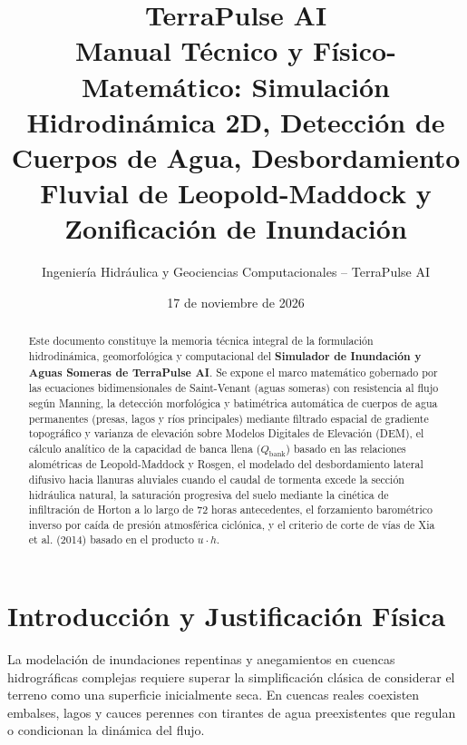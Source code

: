 \documentclass[11pt,a4paper]{article}
\title{\textbf{TerraPulse AI}\\[6pt]\Large Manual Técnico y Físico-Matemático: Simulación Hidrodinámica 2D, Detección de Cuerpos de Agua, Desbordamiento Fluvial de Leopold-Maddock y Zonificación de Inundación}
\author{Ingeniería Hidráulica y Geociencias Computacionales -- TerraPulse AI}
\date{17 de noviembre de 2026}
\begin{document}
\maketitle

\begin{abstract}
Este documento constituye la memoria técnica integral de la formulación hidrodinámica, geomorfológica y computacional del \textbf{Simulador de Inundación y Aguas Someras de TerraPulse AI}. Se expone el marco matemático gobernado por las ecuaciones bidimensionales de Saint-Venant (aguas someras) con resistencia al flujo según Manning, la detección morfológica y batimétrica automática de cuerpos de agua permanentes (presas, lagos y ríos principales) mediante filtrado espacial de gradiente topográfico y varianza de elevación sobre Modelos Digitales de Elevación (DEM), el cálculo analítico de la capacidad de banca llena ($Q_{\text{bank}}$) basado en las relaciones alométricas de Leopold-Maddock y Rosgen, el modelado del desbordamiento lateral difusivo hacia llanuras aluviales cuando el caudal de tormenta excede la sección hidráulica natural, la saturación progresiva del suelo mediante la cinética de infiltración de Horton a lo largo de 72 horas antecedentes, el forzamiento barométrico inverso por caída de presión atmosférica ciclónica, y el criterio de corte de vías de Xia et al. (2014) basado en el producto $u \cdot h$.
\end{abstract}

\tableofcontents
\newpage

\section{Introducción y Justificación Física}

La modelación de inundaciones repentinas y anegamientos en cuencas hidrográficas complejas requiere superar la simplificación clásica de considerar el terreno como una superficie inicialmente seca. En cuencas reales coexisten embalses, lagos y cauces perennes con tirantes de agua preexistentes que regulan o condicionan la dinámica del flujo.
\end{document}

